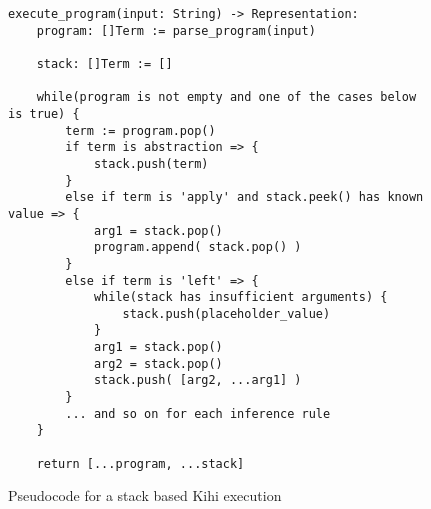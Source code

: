 \begin{figure}[htb]
    \centering
    \begin{lstlisting}
execute_program(input: String) -> Representation:
    program: []Term := parse_program(input)
    
    stack: []Term := []
    
    while(program is not empty and one of the cases below is true) {
        term := program.pop()
        if term is abstraction => {
            stack.push(term)
        }
        else if term is 'apply' and stack.peek() has known value => {
            arg1 = stack.pop()
            program.append( stack.pop() )
        }
        else if term is 'left' => {
            while(stack has insufficient arguments) {
                stack.push(placeholder_value)
            }
            arg1 = stack.pop()
            arg2 = stack.pop()
            stack.push( [arg2, ...arg1] )
        }
        ... and so on for each inference rule
    }

    return [...program, ...stack]
    \end{lstlisting}
    \caption{Pseudocode for a stack based Kihi execution}
    \label{fig:symbol_optimisation_pseudocode}
\end{figure}